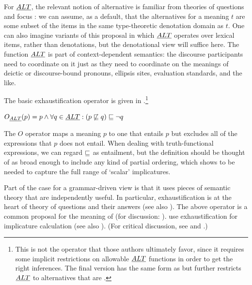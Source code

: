 \documentclass{article}
\begin{document}
For $\emph{ALT}$, the relevant notion of alternative is familiar from
theories of questions and focus \citep{Groenendijk84,Rooth85,Rooth92}:
we can assume, as a default, that the alternatives for a meaning $t$
are some subset of the items in the same type-theoretic denotation
domain as $t$.  One can also imagine variants of this proposal in
which $\emph{ALT}$ operates over lexical items, rather than denotations, but
the denotational view will suffice here.  The function $\emph{ALT}$ is part
of context-dependent semantics: the discourse participants need to
coordinate on it just as they need to coordinate on the meanings of
deictic or discourse-bound pronouns, ellipsis sites, evaluation
standards, and the like.

The basic exhaustification operator is given in 
\citep{Spector:2007,Fox:2007,Fox:2009,Magri:2009,ChierchiaFoxSpector08}.\footnote{This
  is not the operator that those authors ultimately favor, since it
  requires some implicit restrictions on allowable $\emph{ALT}$ functions in
  order to get the right inferences.  The final version has the same
  form as  but further restricts $\emph{ALT}$ to alternatives that
  are .}
%
\begin{examples}
\item\label{def:O}
  $O_{\emph{ALT}}(p) = p \wedge \forall q \in \emph{ALT} : (p \not\sqsubseteq q) \sqsubseteq \neg q$
\end{examples}
%
The $O$ operator maps a meaning $p$ to one that entails $p$ but
excludes all of the expressions that $p$ does not entail. When dealing
with truth-functional expressions, we can regard $\sqsubseteq$ as
entailment, but the definition should be thought of as broad enough to
include any kind of partial ordering, which 
shows to be needed to capture the full range of `scalar' implicatures.

Part of the case for a grammar-driven view is that it uses pieces of
semantic theory that are independently useful. In particular,
exhaustification is at the heart of  theory
of questions and their answers (see also
\citealt{JohnMcCarthy80}). The above operator is a common proposal for
the meaning of  (for discussion:
\citealt{Rooth96,Buring01,BeaverClark08}).  \citet{SchulzVanRooij06}
use exhaustification for implicature calculation (see also
\citealt{deJagerVanRooij07}).  (For critical discussion, see
\citealt{Alonso-Ovalle:2008} and \citealt{Gajewski:2012}.)
\end{document}
